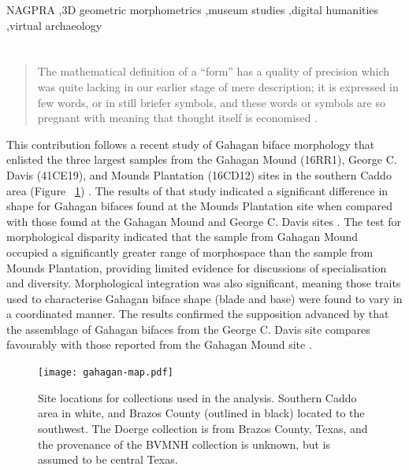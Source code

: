 \documentclass[review]{elsarticle}
\begin{document}
\begin{frontmatter}
\begin{keyword}
NAGPRA \sep 3D geometric morphometrics \sep museum studies \sep digital humanities \sep virtual archaeology
\end{keyword}

\end{frontmatter}

\linenumbers

\section*{}

\begin{quote}
The mathematical definition of a ``form'' has a quality of precision which was quite lacking in our earlier stage of mere description; it is expressed in few words, or in still briefer symbols, and these words or symbols are so pregnant with meaning that thought itself is economised \citep[720-721]{RN11532}.
\end{quote}

This contribution follows a recent study of Gahagan biface morphology that enlisted the three largest samples from the Gahagan Mound (16RR1), George C. Davis (41CE19), and Mounds Plantation (16CD12) sites in the southern Caddo area (Figure ~\ref{fig:figmap}) \citep{RN11783}. The results of that study indicated a significant difference in shape for Gahagan bifaces found at the Mounds Plantation site when compared with those found at the Gahagan Mound and George C. Davis sites \citep[Figure 7]{RN11783}. The test for morphological disparity indicated that the sample from Gahagan Mound occupied a significantly greater range of morphospace than the sample from Mounds Plantation, providing limited evidence for discussions of specialisation and diversity. Morphological integration was also significant, meaning those traits used to characterise Gahagan biface shape (blade and base) were found to vary in a coordinated manner. The results confirmed the supposition advanced by \cite{RN3684} that the assemblage of Gahagan bifaces from the George C. Davis site compares favourably with those reported from the Gahagan Mound site \citep{RN5274,RN2740}.

\begin{figure}[ht]\centering
\texttt{[image: gahagan-map.pdf]}
\caption{Site locations for collections used in the analysis. Southern Caddo area in white, and Brazos County (outlined in black) located to the southwest. The Doerge collection is from Brazos County, Texas, and the provenance of the BVMNH collection is unknown, but is assumed to be central Texas.}
\label{fig:figmap}
\end{figure}
\end{document}

